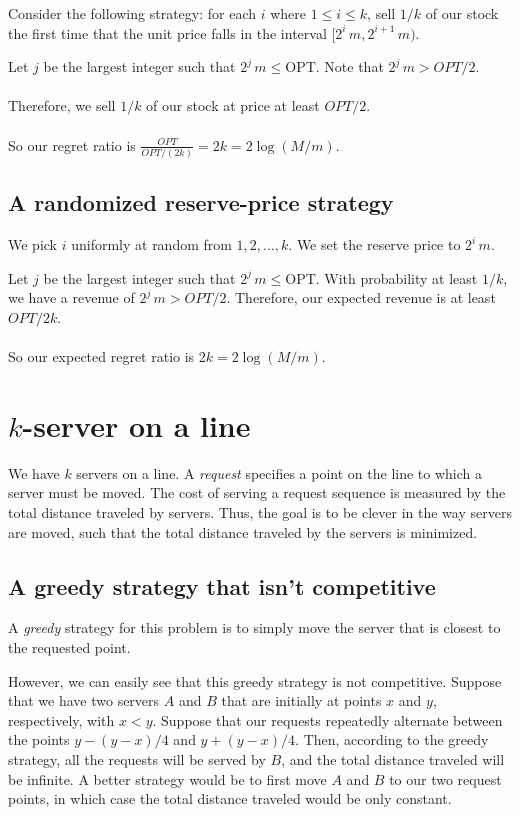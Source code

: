 \documentclass{article}
\begin{document}
Consider the following strategy:
for each $i$ where $1 \le i \le k$, 
sell $1/k$ of our stock the first time that the 
unit price falls in the interval $[2^i\, m, 2^{i+1} \,m)$.

Let $j$ be the largest integer such that $2^j\, m \le $OPT. Note that $2^j\, m > OPT/2$.
\\\\
Therefore, we sell $1/k$ of our stock at price at least $OPT/2$.
\\\\
So our regret ratio is $\frac{OPT}{OPT/(2k)} = 2k = 2\log(M/m)$.

\subsection{A randomized reserve-price strategy}
We pick $i$ uniformly at random from $1, 2, \ldots, k$. We set the reserve price to $2^i \,m$.

Let $j$ be the largest integer such that $2^j\, m \le $OPT. With probability at least $1/k$, we have a revenue of $2^j\, m > OPT/2$. Therefore, our expected revenue is at least $OPT/2k$.
\\\\
So our expected regret ratio is $2k = 2\log(M/m)$.


\section{$k$-server on a line}
We have $k$ servers on a line.
A \emph{request} specifies a point on the line to which a server must
be moved. The cost of serving a request sequence is measured by the total
distance traveled by servers. Thus, the goal is to be clever in the way servers are moved, such that
the total distance traveled by the servers is minimized.

\subsection{A greedy strategy that isn't competitive}

A \emph{greedy} strategy for this problem is to simply move the server
that is closest to the requested point.

However, we can easily see that this greedy strategy is not
competitive.
Suppose that we have two servers $A$ and $B$ that are 
initially at points $x$ and $y$, respectively, with $x<y$.
Suppose that our requests repeatedly alternate between the points
$y-(y-x)/4$ and $y+(y-x)/4$.
Then, according to the greedy strategy, all the requests will be
served by $B$, and the total distance traveled will be infinite.
A better strategy would be to first move $A$ and $B$ to our two
request points, in which case the total distance traveled would be
only constant.
\\
\end{document}
